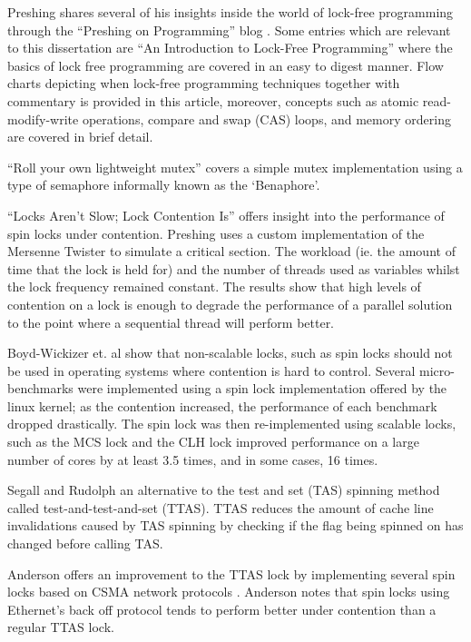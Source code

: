 \documentclass[a4paper, 12pt, titlepage]{article}
\begin{document}
\begin{onehalfspacing}
Preshing shares several of his insights inside the world of lock-free programming through the ``Preshing on Programming'' blog \cite{preshing}. Some entries which are relevant to this dissertation are ``An Introduction to Lock-Free Programming''\cite{introlockfree} where the basics of lock free programming are covered in an easy to digest manner. Flow charts depicting when lock-free programming techniques together with commentary is provided in this article, moreover, concepts such as atomic read-modify-write operations, compare and swap (CAS) loops, and memory ordering are covered in brief detail. 

``Roll your own lightweight mutex''\cite{preshingmutex} covers a simple mutex implementation using a type of semaphore informally known as the `Benaphore'\cite{haikubenaphore}.

``Locks Aren't Slow; Lock Contention Is''\cite{preshinglockcontentionslow} offers insight into the performance of spin locks under contention. Preshing uses a custom implementation of the Mersenne Twister \cite{matsumoto1998mersenne} to simulate a critical section. The workload (ie. the amount of time that the lock is held for) and the number of threads used as variables whilst the lock frequency remained constant. The results show that high levels of contention on a lock is enough to degrade the performance of a parallel solution to the point where a sequential thread will perform better.

Boyd-Wickizer et. al show that non-scalable locks, such as spin locks should not be used in operating systems where contention is hard to control. Several micro-benchmarks were implemented using a spin lock implementation offered by the linux kernel; as the contention increased, the performance of each benchmark dropped drastically. The spin lock was then re-implemented using scalable locks, such as the MCS lock \cite{mellor1991algorithms} and the CLH lock \cite{craig1993building,magnusson1994queue} improved performance on a large number of cores by at least 3.5 times, and in some cases, 16 times.

Segall and Rudolph \cite{rudolph1984dynamic} an alternative to the test and set (TAS) spinning method called test-and-test-and-set (TTAS). TTAS reduces the amount of cache line invalidations caused by TAS spinning by checking if the flag being spinned on has changed before calling TAS.

Anderson offers an improvement to the TTAS lock by implementing several spin locks based on CSMA network protocols \cite{anderson1990performance}. Anderson notes that spin locks using Ethernet's back off protocol tends to perform better under contention than a regular TTAS lock.


\end{onehalfspacing}
\end{document}
